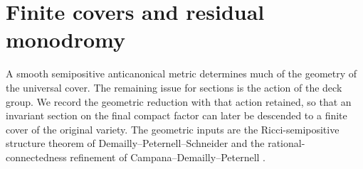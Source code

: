 \section{Finite covers and residual monodromy}
\label{sec:cover}\label{sec:structure}

A smooth semipositive anticanonical metric determines much of the
geometry of the universal cover.  The remaining issue for sections is
the action of the deck group.  We record the geometric reduction with
that action retained, so that an invariant section on the final compact
factor can later be descended to a finite cover of the original variety.
The geometric inputs are the Ricci-semipositive structure theorem of
Demailly--Peternell--Schneider \cite[Structure Theorem and \S3]{DPS1996}
and the rational-connectedness refinement of
Campana--Demailly--Peternell \cite[Theorem~1.4]{CDP2015}.

